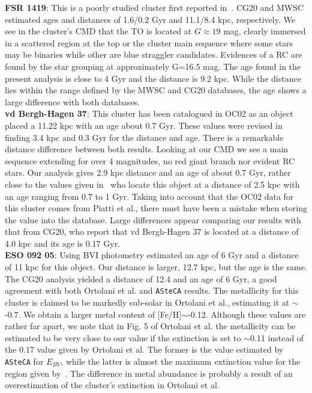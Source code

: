 \documentclass{aa}
\begin{document}
\begin{appendix}
  \noindent \textbf{FSR 1419}: This is a poorly studied cluster first reported
  in~\cite{Froebrich_2007}. CG20 and MWSC estimated ages and distances of
  1.6/0.2 Gyr and 11.1/8.4 kpc, respectively.
  We see in the cluster's  CMD that the TO is located at $G\approx19$ mag,
  clearly immersed in a scattered region at the top or the cluster main sequence
  where some stars may be binaries while other are blue straggler candidates.
  Evidences of a RC are found by the star grouping at approximately G=16.5 mag.
  The age found in the present analysis is close to 4 Gyr and the distance is
  9.2 kpc. While the distance lies within the range defined by the MWSC and CG20
  databases, the age shows a large difference with both databases.\\  

  \noindent \textbf{vd Bergh-Hagen 37}: This cluster has been catalogued in OC02
  as an object placed a 11.22 kpc with an age about 0.7 Gyr. These values were
  revised in~\cite{Dias_2021} finding 3.4 kpc and 0.3 Gyr for the distance and
  age. There is a remarkable distance difference between both results. 
  Looking at our CMD we see a main sequence extending for over 4 magnitudes, no
  red giant branch nor evident RC stars. Our analysis gives 2.9 kpc distance and
  an age of about 0.7 Gyr, rather close to the values given
  in~\cite{Piatti_2010} who locate this object at a distance of 2.5 kpc with an
  age ranging from 0.7 to 1 Gyr. Taking into account that the OC02 data for this
  cluster comes from Piatti et al., there must have been a mistake when storing
  the value into the database.
  Large differences appear comparing our results with that from CG20, who
  report that vd Bergh-Hagen 37 is located at a distance of 4.0 kpc and its age
  is 0.17 Gyr.\\

  \noindent \textbf{ESO 092 05}: Using BVI photometry \cite{Ortolani_2008} estimated
  an age of 6 Gyr and a distance of 11 kpc for this object. Our distance is
  larger, 12.7 kpc, but the age is the same.
  The CG20 analysis yielded a distance of 12.4 and an age of 6 Gyr, a good
  agreement with both Ortolani et al. and \texttt{ASteCA} results.
  The metallicity for this cluster is claimed to be markedly sub-solar in
  Ortolani et al., estimating it at $\sim$-0.7. We obtain a
  larger metal content of [Fe/H]$\sim$-0.12. Although these values are rather far
  apart, we note that in Fig. 5 of Ortolani et al. the metallicity can be
  estimated to be very close to our value if the extinction is set to
  $\sim$0.11 instead of the 0.17 value given by Ortolani et al. The former is
  the value estimated by \texttt{ASteCA} for $E_{BV}$, while the latter
  is almost the maximum extinction value for the region given
  by~\cite{Schlafly_2011}. The difference in metal abundance is probably a
  result of an overestimation of the cluster's extinction in Ortolani et al.\\


\end{appendix}
\end{document}
